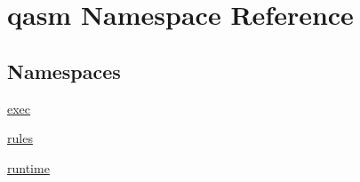 \hypertarget{namespaceqasm}{}\section{qasm Namespace Reference}
\label{namespaceqasm}
\subsection*{Namespaces}
\begin{DoxyCompactItemize}
\item 
 \hyperlink{namespaceqasm_1_1exec}{exec}
\item 
 \hyperlink{namespaceqasm_1_1rules}{rules}
\item 
 \hyperlink{namespaceqasm_1_1runtime}{runtime}
\end{DoxyCompactItemize}

